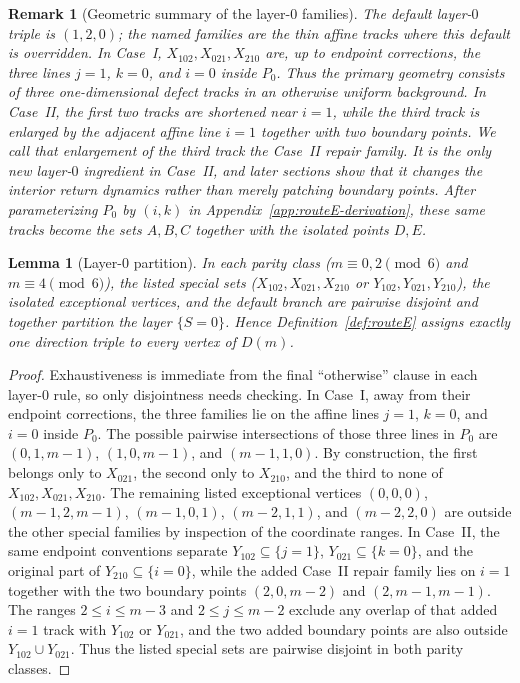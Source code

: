 \documentclass[11pt]{article}
\newtheorem{lemma}{Lemma}
\newtheorem{remark}{Remark}
\begin{document}
\begin{remark}[Geometric summary of the layer-$0$ families]\label{rem:routeE-layer0-geometry}
The default layer-$0$ triple is $(1,2,0)$; the named families are the thin affine tracks where this default is overridden.
In Case~I, $X_{102},X_{021},X_{210}$ are, up to endpoint corrections, the three lines $j=1$, $k=0$, and $i=0$ inside $P_0$.
Thus the primary geometry consists of three one-dimensional defect tracks in an otherwise uniform background.
In Case~II, the first two tracks are shortened near $i=1$, while the third track is enlarged by the adjacent affine line $i=1$ together with two boundary points.
We call that enlargement of the third track the \emph{Case~II repair family}.
It is the only new layer-$0$ ingredient in Case~II, and later sections show that it changes the interior return dynamics rather than merely patching boundary points.
After parameterizing $P_0$ by $(i,k)$ in Appendix~\ref{app:routeE-derivation}, these same tracks become the sets $A,B,C$ together with the isolated points $D,E$.
\end{remark}

\begin{lemma}[Layer-$0$ partition]\label{rem:layer0-partition}
In each parity class ($m\equiv 0,2\pmod 6$ and $m\equiv 4\pmod 6$), the listed special sets ($X_{102},X_{021},X_{210}$ or $Y_{102},Y_{021},Y_{210}$), the isolated exceptional vertices, and the default branch are pairwise disjoint and together partition the layer $\{S=0\}$.
Hence Definition~\ref{def:routeE} assigns exactly one direction triple to every vertex of $D(m)$.
\end{lemma}

\begin{proof}
Exhaustiveness is immediate from the final ``otherwise'' clause in each layer-$0$ rule, so only disjointness needs checking.
In Case~I, away from their endpoint corrections, the three families lie on the affine lines $j=1$, $k=0$, and $i=0$ inside $P_0$.
The possible pairwise intersections of those three lines in $P_0$ are $(0,1,m-1)$, $(1,0,m-1)$, and $(m-1,1,0)$.
By construction, the first belongs only to $X_{021}$, the second only to $X_{210}$, and the third to none of $X_{102},X_{021},X_{210}$.
The remaining listed exceptional vertices $(0,0,0)$, $(m-1,2,m-1)$, $(m-1,0,1)$, $(m-2,1,1)$, and $(m-2,2,0)$ are outside the other special families by inspection of the coordinate ranges.
In Case~II, the same endpoint conventions separate $Y_{102}\subseteq\{j=1\}$, $Y_{021}\subseteq\{k=0\}$, and the original part of $Y_{210}\subseteq\{i=0\}$, while the added Case~II repair family lies on $i=1$ together with the two boundary points $(2,0,m-2)$ and $(2,m-1,m-1)$.
The ranges $2\le i\le m-3$ and $2\le j\le m-2$ exclude any overlap of that added $i=1$ track with $Y_{102}$ or $Y_{021}$, and the two added boundary points are also outside $Y_{102}\cup Y_{021}$.
Thus the listed special sets are pairwise disjoint in both parity classes.
\end{proof}
\end{document}
